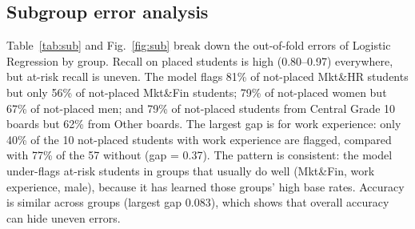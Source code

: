 \documentclass[runningheads]{llncs}
\begin{document}
\subsection{Subgroup error analysis}
Table~\ref{tab:sub} and Fig.~\ref{fig:sub} break down the out-of-fold errors of Logistic Regression by group. Recall on placed students is high (0.80--0.97) everywhere, but at-risk recall is uneven. The model flags 81\% of not-placed Mkt\&HR students but only 56\% of not-placed Mkt\&Fin students; 79\% of not-placed women but 67\% of not-placed men; and 79\% of not-placed students from Central Grade 10 boards but 62\% from Other boards. The largest gap is for work experience: only 40\% of the 10 not-placed students with work experience are flagged, compared with 77\% of the 57 without (gap = 0.37). The pattern is consistent: the model under-flags at-risk students in groups that usually do well (Mkt\&Fin, work experience, male), because it has learned those groups' high base rates. Accuracy is similar across groups (largest gap 0.083), which shows that overall accuracy can hide uneven errors.
\end{document}
